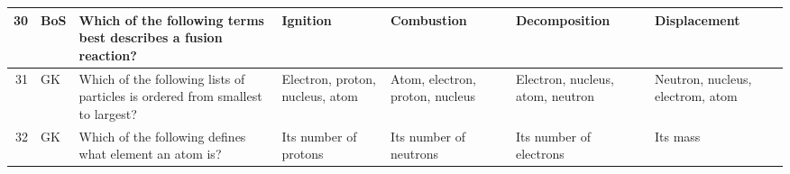 \documentclass[10pt]{article}
\begin{document}
\begin{tiny}
\begin{longtable}{r|p{0.375in}|p{1.275in}|p{0.75in}|p{0.75in}|p{0.75in}|p{0.75in}}
    30    &     BoS &                                                                                                                                                                                                                   Which of the following terms best describes a fusion reaction? &                                                                                                                              Ignition &                                                                                            Combustion &                                                                                                              Decomposition &                                                                                                                      Displacement \\\hline
    31    &      GK &                                                                                                                                                                                                   Which of the following lists of particles is ordered from smallest to largest? &                                                                                                       Electron, proton, nucleus, atom &                                                                       Atom, electron, proton, nucleus &                                                                                           Electron, nucleus, atom, neutron &                                                                                                  Neutron, nucleus, electrom, atom \\\hline
    32    &      GK &                                                                                                                                                                                                                          Which of the following defines what element an atom is? &                                                                                                                 Its number of protons &                                                                                Its number of neutrons &                                                                                                    Its number of electrons &                                                                                                                          Its mass \\\hline

\end{longtable}
\end{tiny}
\end{document}
